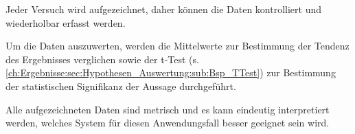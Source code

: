 Jeder Versuch wird aufgezeichnet, daher können die Daten kontrolliert und wiederholbar erfasst werden.

Um die Daten auszuwerten, werden die Mittelwerte zur Bestimmung der Tendenz des Ergebnisses verglichen sowie der t-Test (s. \autoref{ch:Ergebnisse:sec:Hypothesen_Auswertung:sub:Bsp_TTest}) zur Bestimmung der statistischen Signifikanz der Aussage durchgeführt.

Alle aufgezeichneten Daten sind metrisch und es kann eindeutig interpretiert werden, welches System für diesen Anwendungsfall besser geeignet sein wird.


